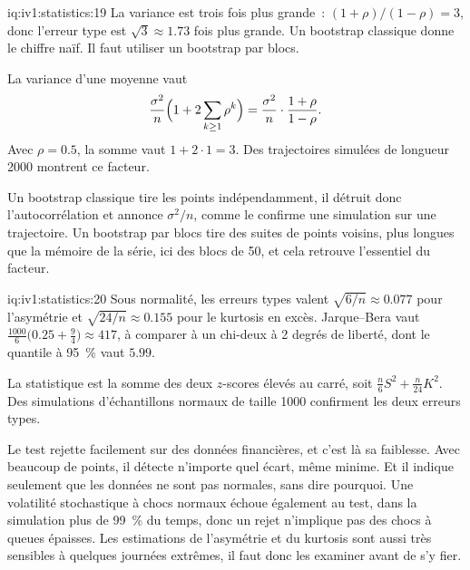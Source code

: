 \enlargethispage{-1\baselineskip}%
\begin{solution}{iq:iv1:statistics:19}
La variance est trois fois plus grande~: $(1 + \rho)/(1 - \rho) = 3$, donc l'erreur type est $\sqrt{3} \approx 1.73$ fois plus grande. Un bootstrap classique donne le chiffre naïf. Il faut utiliser un bootstrap par blocs.

La variance d'une moyenne vaut
\[
\frac{\sigma^2}{n}\Bigl(1 + 2\sum_{k \ge 1} \rho^k\Bigr) = \frac{\sigma^2}{n} \cdot \frac{1 + \rho}{1 - \rho}.
\]
Avec $\rho = 0.5$, la somme vaut $1 + 2 \cdot 1 = 3$. Des trajectoires simulées de longueur 2000 montrent ce facteur.

Un bootstrap classique tire les points indépendamment, il détruit donc l'autocorrélation et annonce $\sigma^2/n$, comme le confirme une simulation sur une trajectoire. Un bootstrap par blocs tire des suites de points voisins, plus longues que la mémoire de la série, ici des blocs de 50, et cela retrouve l'essentiel du facteur.

\end{solution}

\begin{solution}{iq:iv1:statistics:20}
Sous normalité, les erreurs types valent $\sqrt{6/n} \approx 0.077$ pour l'asymétrie et $\sqrt{24/n} \approx 0.155$ pour le kurtosis en excès. Jarque--Bera vaut $\frac{1000}{6}\bigl(0.25 + \frac94\bigr) \approx 417$, à comparer à un chi-deux à 2 degrés de liberté, dont le quantile à 95~\% vaut $5.99$.

La statistique est la somme des deux $z$-scores élevés au carré, soit $\frac{n}{6}S^2 + \frac{n}{24}K^2$. Des simulations d'échantillons normaux de taille 1000 confirment les deux erreurs types.

Le test rejette facilement sur des données financières, et c'est là sa faiblesse. Avec beaucoup de points, il détecte n'importe quel écart, même minime. Et il indique seulement que les données ne sont pas normales, sans dire pourquoi. Une volatilité stochastique à chocs normaux échoue également au test, dans la simulation plus de 99~\% du temps, donc un rejet n'implique pas des chocs à queues épaisses. Les estimations de l'asymétrie et du kurtosis sont aussi très sensibles à quelques journées extrêmes, il faut donc les examiner avant de s'y fier.

\end{solution}

